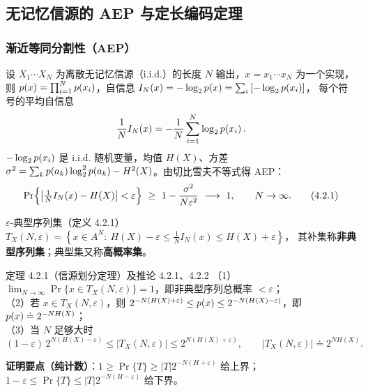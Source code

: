 \subsection{无记忆信源的 AEP 与定长编码定理}

\subsubsection{渐近等同分割性（AEP）}
设 $X_1\cdots X_N$ 为离散无记忆信源（i.i.d.）的长度 $N$ 输出，$x=x_1\cdots x_N$ 为一个实现，
则 $p\!\left(x\right)=\prod_{i=1}^{N}p\!\left(x_i\right)$，自信息 $I_N(x)=-\log_{2}p\!\left(x\right)=\sum_i\left[-\log_{2}p\!\left(x_i\right)\right]$，
每个符号的平均自信息
\begin{equation*}
\frac{1}{N}I_N(x)=-\frac{1}{N}\sum_{i=1}^{N}\log_{2}p\!\left(x_i\right).
\end{equation*}
$-\log_{2}p\!\left(x_i\right)$ 是 i.i.d. 随机变量，均值 $H(X)$、方差
$\sigma^2=\sum_kp(a_k)\log_{2}^2p(a_k)-H^2(X)$。由切比雪夫不等式得 AEP：
\begin{equation}
\Pr\Bigl\{\bigl|\tfrac{1}{N}I_N(x)-H(X)\bigr|<\varepsilon\Bigr\}
\ \ge\ 1-\frac{\sigma^{2}}{N\varepsilon^{2}}\ \longrightarrow\ 1 ,
\qquad N\to\infty .
\tag{4.2.1}
\end{equation}

\begin{defbox}{$\varepsilon$-典型序列集（定义 4.2.1）}
$T_X(N,\varepsilon)=\left\{x\in A^{N}:\ H(X)-\varepsilon\le\frac{1}{N}I_N(x)\le H(X)+\varepsilon\right\}$，
其补集称\textbf{非典型序列集}；典型集又称\textbf{高概率集}。
\end{defbox}

\begin{thmbox}{定理 4.2.1（信源划分定理）及推论 4.2.1、4.2.2}
（1）$\displaystyle\lim_{N\to\infty}\Pr\{x\in T_X(N,\varepsilon)\}=1$，即非典型序列总概率 $<\varepsilon$；\\
（2）若 $x\in T_X(N,\varepsilon)$，则
$2^{-N\left(H(X)+\varepsilon\right)}\le p\!\left(x\right)\le2^{-N\left(H(X)-\varepsilon\right)}$，即 $p\!\left(x\right)\doteq2^{-NH(X)}$；\\
（3）当 $N$ 足够大时
\begin{equation}
(1-\varepsilon)\,2^{N\left(H(X)-\varepsilon\right)}\le\left|T_X(N,\varepsilon)\right|
\le2^{N\left(H(X)+\varepsilon\right)},
\qquad\left|T_X(N,\varepsilon)\right|\doteq2^{NH(X)} .
\tag{4.2.4}
\end{equation}
\end{thmbox}
\textbf{证明要点（纯计数）}：$1\ge\Pr\{T\}\ge|T|2^{-N(H+\varepsilon)}$ 给上界；
$1-\varepsilon\le\Pr\{T\}\le|T|2^{-N(H-\varepsilon)}$ 给下界。

